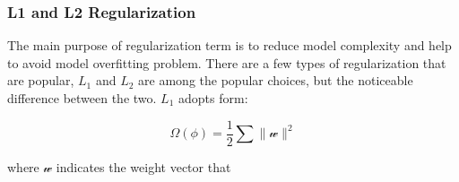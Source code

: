 \subsubsection{L1 and L2 Regularization}

The main purpose of regularization term is to reduce model complexity and help to avoid model overfitting problem. There are a few types of regularization that are popular, $L_1$ and $L_2$ are among the popular choices, but the noticeable difference between the two. $L_1$ adopts form:

\begin{equation}
   \Omega(\phi) = \frac {1}{2} \sum \parallel \mathcal{w} \parallel^2
\end{equation}

where $\mathcal{w}$ indicates the weight vector that